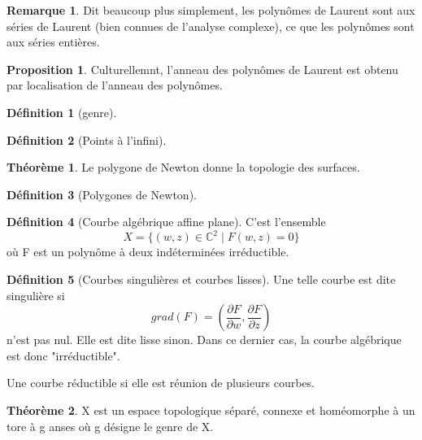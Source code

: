 \documentclass{article}
\newcommand{\C}{\mathbb{C}} %
\theoremstyle{definition} %
\newtheorem{defi}{Définition}
\newtheorem{rmq}{Remarque}
\newtheorem{thm}{Théorème}
\newtheorem{prop}{Proposition}
\newcommand{\1}{\mathbb{1}} %
\begin{document}
\begin{rmq}
Dit beaucoup plus simplement, les polynômes de Laurent sont aux séries de Laurent (bien connues de l'analyse complexe), ce que les polynômes sont aux séries entières.
\end{rmq}

\begin{prop}
\label{localisationplnlaurent}
Culturellemnt, l'anneau des polynômes de Laurent est obtenu par localisation de l'anneau des polynômes.
\end{prop}

\begin{defi}[genre]

\end{defi}

\begin{defi}[Points à l'infini]

\end{defi}

\begin{thm}
Le polygone de Newton donne la topologie des surfaces.
\end{thm}


\begin{defi}[Polygones de Newton]

\end{defi}

\begin{defi}[Courbe algébrique affine plane]
C'est l'ensemble 
$$X=\{(w,z) \in \C^2 \mid F(w,z)=0\}$$
où F est un polynôme à deux indéterminées irréductible.
\end{defi}


\begin{defi}[Courbes singulières et courbes lisses]
Une telle courbe est dite singulière si
$$grad(F)=(\frac{\partial F}{\partial w},\frac{\partial F}{\partial z})$$
n'est pas nul.
Elle est dite lisse sinon.
Dans ce dernier cas, la courbe algébrique est donc "irréductible".
\end{defi}

Une courbe réductible si elle est réunion de plusieurs courbes.


\begin{thm}
X est un espace topologique séparé, connexe et homéomorphe à un tore à g anses où g désigne le genre de X.
\end{thm}
\end{document}
